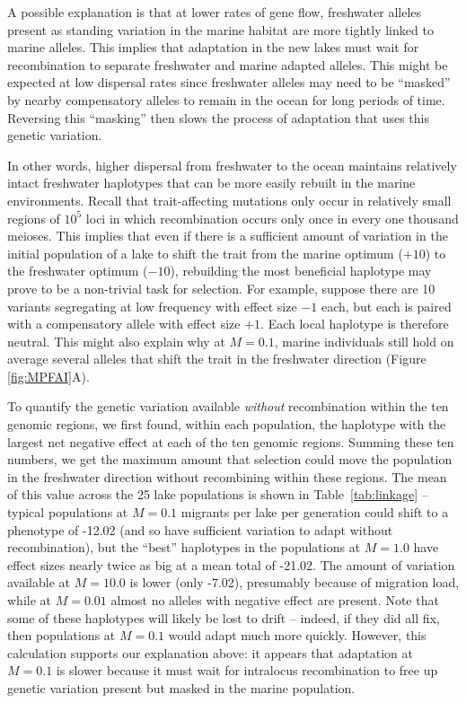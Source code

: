 \documentclass{article}
\newcommand{\plr}[1]{\todo[linecolor=blue,backgroundcolor=blue!25,bordercolor=blue]{#1}}
\begin{document}
A possible explanation is that at lower rates of gene flow, freshwater alleles present as standing variation in the marine habitat are more tightly linked to marine alleles. 
This implies that adaptation in the new lakes must wait for recombination to separate freshwater and marine adapted alleles. 
This might be expected at low dispersal rates since freshwater alleles may need to be ``masked'' by nearby compensatory alleles to remain in the ocean for long periods of time. 
Reversing this ``masking'' then slows the process of adaptation that uses this genetic variation.


In other words, higher dispersal from freshwater to the ocean maintains relatively intact freshwater haplotypes that can be more easily rebuilt in the marine environments. Recall that trait-affecting mutations only occur in relatively small regions of $10^5$ loci in which recombination occurs only once in every one thousand meioses. This implies that even if there is a sufficient amount of variation in the initial population of a lake to shift the trait from the marine optimum ($+10$) to the freshwater optimum ($-10$), rebuilding the most beneficial haplotype may prove to be a non-trivial task for selection.
For example, suppose there are 10 variants segregating at low frequency with effect size $-1$ each, but each is paired with a compensatory allele with effect size $+1$. Each local haplotype is therefore neutral. This might also explain why at $M=0.1$, marine individuals still hold on average several alleles that shift the trait in the freshwater direction
(Figure \ref{fig:MPFAI}A).

To quantify the genetic variation available \emph{without} recombination within the ten genomic regions, we first found, within each population, the haplotype with the largest net negative effect at each of the ten genomic regions. Summing these ten numbers, we get the maximum amount that selection could move the population in the freshwater direction without recombining {within} these regions. The mean of this value across the 25 lake populations is shown in Table~\ref{tab:linkage} -- typical populations at $M=0.1$ migrants per lake per generation could shift to a phenotype of -12.02
(and so have sufficient variation to adapt without recombination), but the ``best'' haplotypes in the populations at $M=1.0$ have effect sizes nearly twice as big at a mean total of -21.02.
The amount of variation available at $M=10.0$ is lower (only -7.02), presumably because of migration load, while at $M=0.01$ almost no alleles with negative effect are present.
Note that some of these haplotypes will likely be lost to drift -- indeed, if they did all fix, then populations at $M=0.1$ would adapt much more quickly. 
However, this calculation supports our explanation above:
it appears that adaptation at $M=0.1$ is slower because it must wait for intralocus recombination to free up genetic variation present but masked in the marine population.
\end{document}
